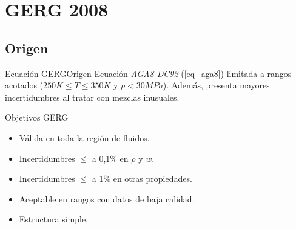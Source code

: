 \documentclass[aspectratio=1610,multi,rgb]{beamer}
\newcommand{\titleframe}[1]{
\begin{frame} \null\hfill\huge{\shadowbox{#1}}\hspace{1cm} \end{frame}}
\begin{document}
\section{GERG 2008}
\titleframe{GERG 2008}

\subsection{Origen}
\begin{frame}{Ecuación GERG}{Origen}
	Ecuación \emph{AGA8-DC92} (\ref{eq_aga8}) limitada a rangos acotados
	($250K \le T \le 350 K$ y $p < 30 MPa$).  Además, presenta mayores
	incertidumbres al tratar con mezclas inusuales.
	\begin{block}{Objetivos GERG}
	\begin{itemize}
	\item Válida en toda la región de fluidos.
	\item Incertidumbres $\le$ a 0,1\% en $\rho$ y $w$.
	\item Incertidumbres $\le$ a 1\% en otras propiedades.
	\item Aceptable en rangos con datos de baja calidad.
	\item Estructura simple.
	\end{itemize}
	\end{block}
\end{frame}
\end{document}
